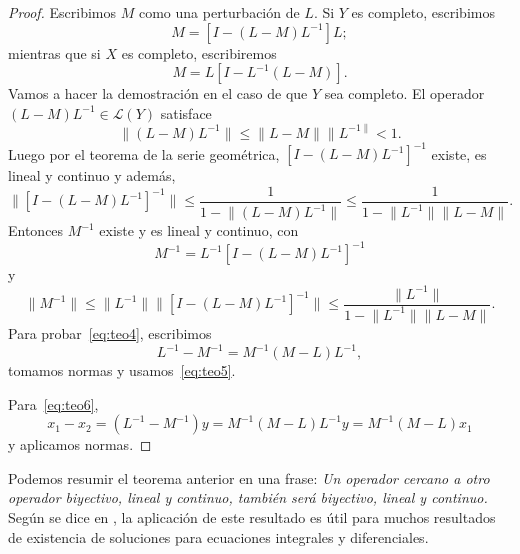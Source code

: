 \begin{proof}
	Escribimos $M$ como una perturbación de $L$. Si $Y$ es completo, escribimos
	\begin{equation}
		M = [I - (L - M)L^{-1}]L;
	\end{equation}
	mientras que si $X$ es completo, escribiremos
	\begin{equation}
		M = L[I - L^{-1}(L - M)].
	\end{equation}
	Vamos a hacer la demostración en el caso de que $Y$ sea completo.
	El operador $(L-M)L^{-1} \in \mathcal{L}(Y)$ satisface
	\begin{equation}
		\lVert (L - M)L^{-1} \rVert \leqslant \lVert L - M \rVert \lVert L^{-1 \rVert} < 1.
	\end{equation}
	Luego por el teorema de la serie geométrica, $[I-(L-M)L^{-1}]^{-1}$ existe, es lineal y continuo y además,
	\begin{equation}
		\lVert [I-(L-M)L^{-1}]^{-1} \rVert \leqslant \dfrac{1}{1 - \lVert (L-M)L^{-1}\rVert} \leqslant \dfrac{1}{1 - \lVert L^{-1} \rVert \lVert L-M \rVert }.
	\end{equation}
	Entonces $M^{-1}$ existe y es lineal y continuo, con
	\begin{equation}
		M^{-1} = L^{-1}[I-(L-M)L^{-1}]^{-1}
	\end{equation}
	y
	\begin{equation}
		\lVert M^{-1} \rVert \leqslant \lVert L^{-1} \rVert \lVert [I-(L-M)L^{-1}]^{-1} \rVert \leqslant \dfrac{\lVert L^{-1} \rVert}{1 - \lVert L^{-1} \rVert \lVert L-M \rVert}.
	\end{equation}
	Para probar~\eqref{eq:teo4}, escribimos
	\begin{equation}
		L^{-1} - M^{-1} = M^{-1}(M-L)L^{-1},
	\end{equation}
	tomamos normas y usamos~\eqref{eq:teo5}.
	
	Para~\eqref{eq:teo6},
	\begin{equation}
		x_1 - x_2 = (L^{-1} - M^{-1})y = M^{-1}(M-L)L^{-1}y = M^{-1}(M-L)x_1
	\end{equation}
	y aplicamos normas.
\end{proof}
Podemos resumir el teorema anterior en una frase: \textit{Un operador cercano a otro operador biyectivo, lineal y continuo, también será biyectivo, lineal y continuo.} Según se dice en \cite{Atkinson}, la aplicación de este resultado es útil para muchos resultados de existencia de soluciones para ecuaciones integrales y diferenciales.

